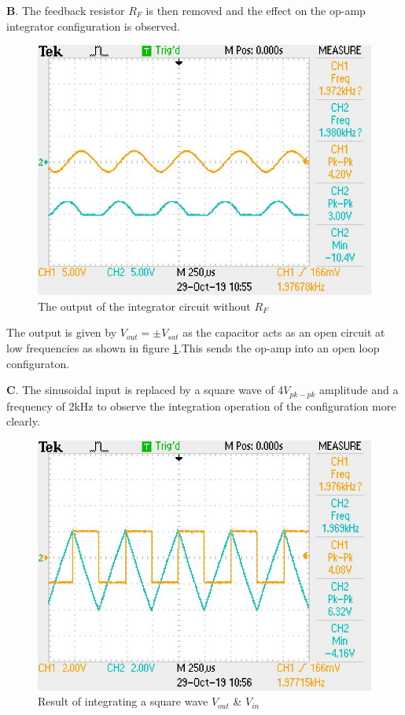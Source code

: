 \documentclass[12pt, titlepage]{article}
\theoremstyle{definition}
\begin{document}
    \textbf{B}. The feedback resistor $R_F$ is then removed and the effect on the op-amp integrator configuration is observed.

    \begin{figure}
      \includegraphics[scale=0.25]{images/results_q2.jpeg}
      \caption{The output of the integrator circuit without $R_F$}
      \label{fig:results_q2}
    \end{figure}

    The output is given by $V_{out}=\pm V_{sat}$ as the capacitor acts as an open circuit at low frequencies as shown in figure \ref{fig:results_q2}.This sends the op-amp into an open loop configuraton.

    \textbf{C}. The sinusoidal input is replaced by a square wave of 4$V_{pk-pk}$ amplitude and a frequency of 2kHz to observe the integration operation of the configuration more clearly.

    \begin{figure}
      \includegraphics[scale=0.25]{images/results_q3.jpeg}
      \caption{Result of integrating a square wave \color{cyan}$V_{out}$ \color{black}\& \color{orange}$V_{in}$}
      \label{fig:results_q3}
    \end{figure}
\end{document}
